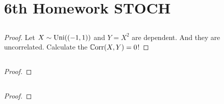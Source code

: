 
\section{6th Homework STOCH}
\subsection{}
\begin{proof}
	Let $X \sim \operatorname{Uni}((-1,1))$ and $Y = X^2$ are dependent. And they are uncorrelated.
	Calculate the $\mathbb{C}\text{orr}(X,Y) = 0$!
\end{proof}

\subsection{}
\begin{proof}
	
\end{proof}
\subsection{}
\begin{proof}
	
\end{proof}
